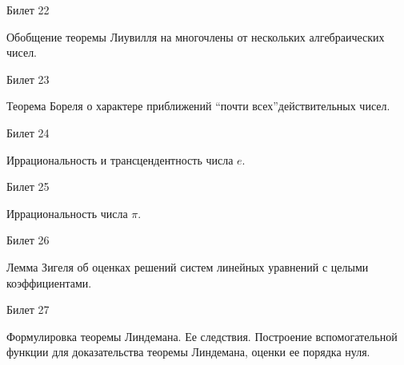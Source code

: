 \documentclass[a4paper,12pt]{article}
\begin{document}
\newpage
\begin{mybox2}{\hypertarget{bil22}{Билет 22}}

\begin{formbox}{}
Обобщение теоремы Лиувилля на многочлены от нескольких алгебраических чисел.
\end{formbox}

\end{mybox2}

\newpage
\begin{mybox}{\hypertarget{bil23}{Билет 23}}

\begin{formbox}{}
Теорема Бореля о характере приближений \textquotedblleft  почти всех\textquotedblright  действительных чисел.
\end{formbox}

\end{mybox}

\newpage
\begin{mybox2}{\hypertarget{bil24}{Билет 24}}

\begin{formbox}{}
Иррациональность и трансцендентность числа $e$.
\end{formbox}

\end{mybox2}

\newpage
\begin{mybox}{\hypertarget{bil25}{Билет 25}}

\begin{formbox}{}
Иррациональность числа $\pi$.
\end{formbox}

\end{mybox}

\newpage
\begin{mybox2}{\hypertarget{bil26}{Билет 26}}

\begin{formbox}{}
Лемма Зигеля об оценках решений систем линейных уравнений с целыми коэффициентами.
\end{formbox}

\end{mybox2}

\newpage
\begin{mybox}{\hypertarget{bil27}{Билет 27}}

\begin{formbox}{}
Формулировка теоремы Линдемана. Ее следствия. Построение вспомогательной функции для доказательства теоремы Линдемана, оценки ее порядка нуля.
\end{formbox}

\end{mybox}
\end{document}
